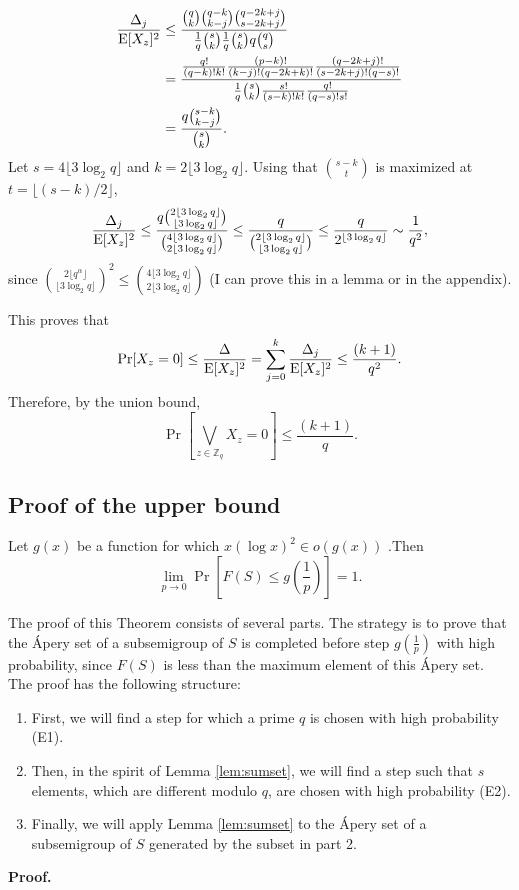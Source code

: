 \begin{align*}
    \frac{\Delta_j}{\mathrm{E}[X_z]^2} &\leq \frac{\binom{q}{k} \binom{q - k}{k - j}\binom{q - 2k + j}{s - 2k + j}}{\frac{1}{q} \binom{s}{k}\frac{1}{q} \binom{s}{k}q\binom{q}{s}} \\
    &= \frac{\frac{q!}{(q - k)!k!}\frac{(p - k)!}{(k - j)!(q - 2k + k)!}\frac{(q - 2k + j)!}{(s - 2k + j)!(q - s)!}}{\frac{1}{q}\binom{s}{k}\frac{s!}{(s - k)!k!}\frac{q!}{(q - s)!s!}} \\
    &= \frac{q\binom{s - k}{k - j}}{\binom{s}{k}}.
\end{align*}
Let $s = 4\lfloor 3 \log_2 q \rfloor$ and $k = 2\lfloor 3 \log_2 q \rfloor$. Using that $\binom{s - k}{t}$ is maximized at $t = \lfloor (s - k) / 2\rfloor$,
\begin{align*}
\frac{\Delta_j}{\mathrm{E}[X_z]^2} \leq \frac{q \binom{2\lfloor 3 \log_2 q\rfloor}{\lfloor 3 \log_2 q \rfloor}}{\binom{4\lfloor 3\log_2 q \rfloor}{2\lfloor 3\log_2 q \rfloor}} \leq \frac{q}{\binom{2\lfloor 3 \log_2 q \rfloor }{ \lfloor 3 \log_2 q \rfloor}} \leq \frac{q}{2^{\lfloor 3 \log_2 q \rfloor}} \sim \frac{1}{q^2},
\end{align*}
since \(\binom{2\lfloor q^{\alpha} \rfloor}{\lfloor 3 \log_2 q \rfloor}^2 \leq \binom{4\lfloor 3 \log_2 q \rfloor }{2\lfloor 3 \log_2 q \rfloor}\) (I can prove this in a lemma or in the appendix).   \par
This proves that
\[\mathrm{Pr}[X_z = 0] \leq \frac{\Delta}{\mathrm{E}[X_z]^2} = \sum_{j = 0}^k \frac{\Delta_j}{\mathrm{E}[X_z]^2} \leq \frac{(k + 1)}{q^2}.\]
Therefore, by the union bound,
\[\Pr\left[\bigvee_{z \in \mathbb{Z}_q} X_z = 0\right] \leq \frac{(k + 1)}{q}.\]

\subsection{Proof of the upper bound} 
\begin{theorem}\label{thm:upperbound}
    Let $g(x)$ be a function for which $x(\log x)^2 \in o(g(x))$ .Then
    \[\lim_{p \to 0}\Pr\left[F(S) \leq g\left(\frac{1}{p}\right)\right] = 1.\] 
\end{theorem}

\par The proof of this Theorem consists of several parts. The strategy is to prove that the Ápery set of a subsemigroup of $S$ is completed before step $g\left(\frac{1}{p}\right)$ with high probability, since $F(S)$ is less than the maximum element of this Ápery set. The proof has the following structure: 
\begin{enumerate}
\item First, we will find a step for which a prime $q$ is chosen with high probability (E1). 
\item Then, in the spirit of Lemma \ref{lem:sumset}, we will find a step such that $s$ elements, which are different modulo $q$, are chosen with high probability (E2). 
\item Finally, we will apply Lemma \ref{lem:sumset} to the Ápery set of a subsemigroup of $S$ generated by the subset in part 2. 
\end{enumerate}
\textbf{Proof. }
